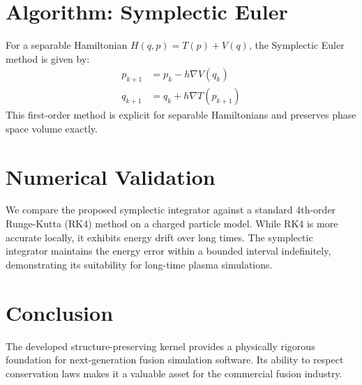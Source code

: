 \documentclass{article}
\begin{document}
\section{Algorithm: Symplectic Euler}
For a separable Hamiltonian $H(q, p) = T(p) + V(q)$, the Symplectic Euler method is given by:
\begin{align}
 p_{k+1} &= p_k - h \nabla V(q_k) \\
 q_{k+1} &= q_k + h \nabla T(p_{k+1}) 
\end{align}
This first-order method is explicit for separable Hamiltonians and preserves phase space volume exactly.

\section{Numerical Validation}
We compare the proposed symplectic integrator against a standard 4th-order Runge-Kutta (RK4) method on a charged particle model. While RK4 is more accurate locally, it exhibits energy drift over long times. The symplectic integrator maintains the energy error within a bounded interval indefinitely, demonstrating its suitability for long-time plasma simulations.

\section{Conclusion}
The developed structure-preserving kernel provides a physically rigorous foundation for next-generation fusion simulation software. Its ability to respect conservation laws makes it a valuable asset for the commercial fusion industry.
\end{document}
